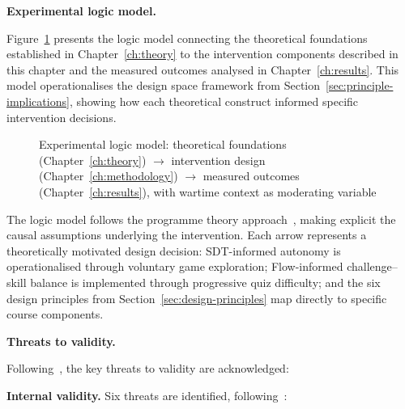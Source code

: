 \textbf{Experimental logic model.}

Figure~\ref{fig:logic-model} presents the logic model connecting the theoretical foundations established in Chapter~\ref{ch:theory} to the intervention components described in this chapter and the measured outcomes analysed in Chapter~\ref{ch:results}. This model operationalises the design space framework from Section~\ref{sec:principle-implications}, showing how each theoretical construct informed specific intervention decisions.

\begin{figure}[!h]
\centering
\resizebox{\textwidth}{!}{%
%
}
\caption{Experimental logic model: theoretical foundations (Chapter~\ref{ch:theory}) $\to$ intervention design (Chapter~\ref{ch:methodology}) $\to$ measured outcomes (Chapter~\ref{ch:results}), with wartime context as moderating variable}
\label{fig:logic-model}
\end{figure}

The logic model follows the programme theory approach~\cite{FunnellRogers2011}, making explicit the causal assumptions underlying the intervention. Each arrow represents a theoretically motivated design decision: SDT-informed autonomy is operationalised through voluntary game exploration; Flow-informed challenge--skill balance is implemented through progressive quiz difficulty; and the six design principles from Section~\ref{sec:design-principles} map directly to specific course components.

\textbf{Threats to validity.}

Following~\cite{ShadishCookCampbell2002}, the key threats to validity are acknowledged:

\textbf{Internal validity.} Six threats are identified, following~\cite{CampbellStanley1963}:

